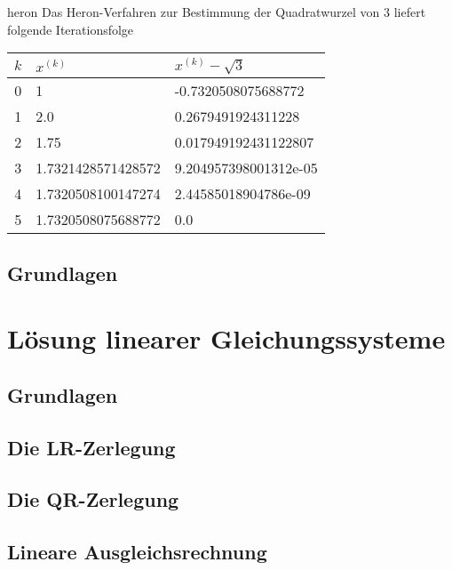 \begin{Beispiel}{heron}
  Das Heron-Verfahren zur Bestimmung der Quadratwurzel von 3 liefert
  folgende Iterationsfolge
  \begin{center}
    \begin{tabular}{c|ll}
      $k$ & $x^{(k)}$ & $x^{(k)} - \sqrt3$\\\hline
      0  &  1  &  -0.7320508075688772 \\
      1  &  2.0  &  0.2679491924311228 \\
      2  &  1.75  &  0.017949192431122807 \\
      3  &  1.7321428571428572  &  9.204957398001312e-05 \\
      4  &  1.7320508100147274  &  2.44585018904786e-09 \\
      5  &  1.7320508075688772  &  0.0
    \end{tabular}
  \end{center}
\end{Beispiel}

\section{Grundlagen}




%


\chapter{Lösung linearer Gleichungssysteme}

\section{Grundlagen}


\section{Die LR-Zerlegung}


\section{Die QR-Zerlegung}


\section{Lineare Ausgleichsrechnung}


